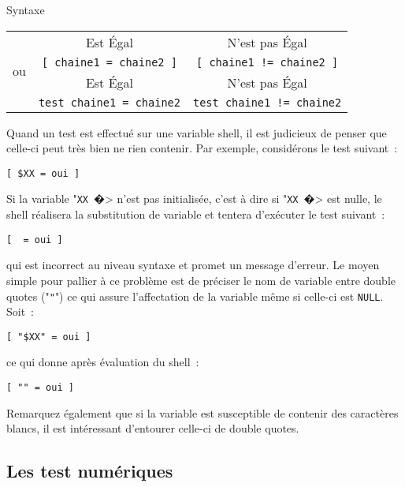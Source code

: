 \begin{definition}{Syntaxe}
\begin{tabular}{l@{\hspace{2ex}}c@{\hspace{3ex}}c}
	\multirow{5}{3ex}{ou}	
	&	Est \'{E}gal	&	N'est pas \'{E}gal	\\
	&	\verb*,[ chaine1 = chaine2 ],	&	\verb*,[ chaine1 != chaine2 ],	\\[2ex]
	&	Est \'{E}gal	&	N'est pas \'{E}gal	\\
	&	\verb*,test chaine1 = chaine2,	&	\verb*,test chaine1 != chaine2,	\\
\end{tabular}
\end{definition}

Quand un test est
effectu{\'e} sur une variable shell, il est judicieux de penser que
celle-ci peut tr{\`e}s bien ne rien contenir. Par exemple,
consid{\'e}rons le test suivant~:
\begin{center}
\verb,[ $XX = oui ],
\end{center}

Si la variable "\texttt{XX}~�> n'est pas initialis{\'e}e, c'est {\`a} dire si
"\texttt{XX}~�> est nulle, le shell r{\'e}alisera la substitution de
variable et tentera d'ex{\'e}cuter le test suivant~:
\begin{center}
\verb,[  = oui ],
\end{center}
qui est incorrect au niveau syntaxe et promet un message d'erreur. Le
moyen simple pour pallier {\`a} ce probl{\`e}me est de pr{\'e}ciser le nom de
variable entre double quotes ("\verb="=") ce qui assure l'affectation de la
variable m{\^e}me si celle-ci est \texttt{NULL}. Soit~:
\begin{center}
\verb,[ "$XX" = oui ],
\end{center}
ce qui donne apr{\`e}s {\'e}valuation du shell~:
\begin{center}
\verb,[ "" = oui ],
\end{center}

Remarquez {\'e}galement que si la variable est susceptible de contenir des
caract{\`e}res blancs, il est int{\'e}ressant d'entourer celle-ci de double
quotes.

\subsection{Les test num{\'e}riques}

